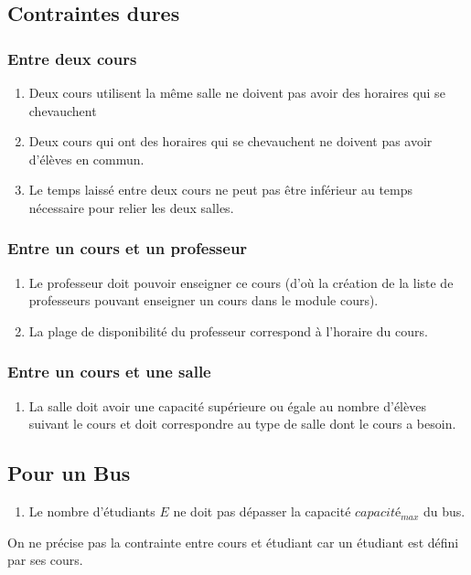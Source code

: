 \documentclass[a4paper,11pt]{article}
\begin{document}
	\subsection{Contraintes dures}
			\subsubsection{Entre deux cours}
				\begin{enumerate}
					\item Deux cours utilisent la même salle ne doivent pas avoir des horaires qui se chevauchent
					\item Deux cours qui ont des horaires qui se chevauchent ne doivent pas avoir d'élèves en commun.
					\item Le temps laissé entre deux cours ne peut pas être inférieur au temps nécessaire pour relier les deux salles.
				\end{enumerate}
			\subsubsection{Entre un cours et un professeur}
				\begin{enumerate}
					\item Le professeur doit pouvoir enseigner ce cours (d'où la création de la liste de professeurs pouvant enseigner un cours dans le module cours).
					\item La plage de disponibilité du professeur correspond à l'horaire du cours.
				\end{enumerate}
			\subsubsection{Entre un cours et une salle}
				\begin{enumerate}
					\item 	La salle doit avoir une capacité supérieure ou égale au nombre d'élèves suivant le cours et doit correspondre au type de salle dont le cours a besoin.
				\end{enumerate}
			\subsection{Pour un Bus}
				\begin{enumerate}
					\item Le nombre d'étudiants $E$ ne doit pas dépasser la capacité $capacité_{max}$ du bus.
				\end{enumerate}
	On ne précise pas la contrainte entre cours et étudiant car un étudiant est défini par ses cours.
\end{document}
